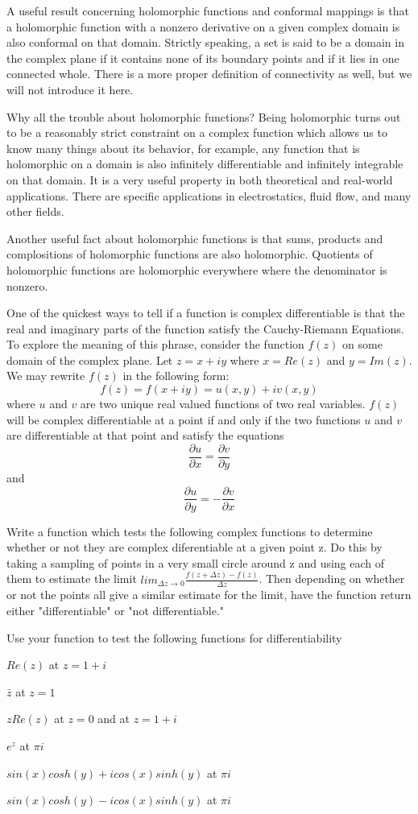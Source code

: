 A useful result concerning holomorphic functions and conformal mappings is that a holomorphic function with a nonzero derivative on a given complex domain is also conformal on that domain. Strictly speaking, a set is said to be a domain in the complex plane if it contains none of its boundary points and if it lies in one connected whole. There is a more proper definition of connectivity as well, but we will not introduce it here.

Why all the trouble about holomorphic functions? Being holomorphic turns out to be a reasonably strict constraint on a complex function which allows us to know many things about its behavior, for example, any function that is holomorphic on a domain is also infinitely differentiable and infinitely integrable on that domain. It is a very useful property in both theoretical and real-world applications. There are specific applications in electrostatics, fluid flow, and many other fields.

Another useful fact about holomorphic functions is that sums, products and complositions of holomorphic functions are also holomorphic. Quotients of holomorphic functions are holomorphic everywhere where the denominator is nonzero.

One of the quickest ways to tell if a function is complex differentiable is that the real and imaginary parts of the function satisfy the Cauchy-Riemann Equations. To explore the meaning of this phrase, consider the function $f(z)$ on some domain of the complex plane. Let $z=x+i y$ where $x=Re(z)$ and $y=Im(z)$. We may rewrite $f(z)$ in the following form: $$f(z)=f(x+i y)=u(x,y)+i v(x,y)$$ where $u$ and $v$ are two unique real valued functions of two real variables. $f(z)$ will be complex differentiable at a point if and only if the two functions $u$ and $v$ are differentiable at that point and satisfy the equations $$\frac{\partial u}{\partial x}=\frac{\partial v}{\partial y}$$ and $$\frac{\partial u}{\partial y}=-\frac{\partial v}{\partial x}$$

\begin{problem}
Write a function which tests the following complex functions to determine whether or not they are complex diferentiable at a given point z. Do this by taking a sampling of points in a very small circle around z and using each of them to estimate the limit $lim_{\Delta z \to 0} \frac{f(z+\Delta z)-f(z)}{\Delta z}$. Then depending on whether or not the points all give a similar estimate for the limit, have the function return either "differentiable" or "not differentiable."

Use your function to test the following functions for differentiability

$Re(z)$ at $z=1+ i$

$\bar{z}$ at $z=1$

$z Re(z)$ at $z=0$ and at $z=1+ i$

$e^z$ at $\pi i$

$sin(x) cosh(y) + i cos(x) sinh(y)$ at $\pi i$

$sin(x) cosh(y) - i cos(x) sinh(y)$ at $\pi i$
\end{problem}

